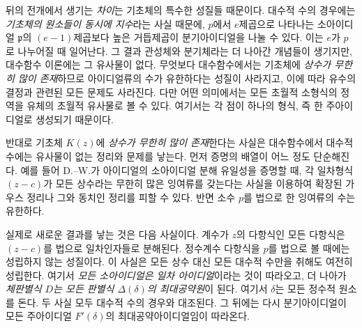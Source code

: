 뒤의 전개에서 생기는 \emph{차이}는 기초체의 특수한 성질들 때문이다. 대수적 수의 경우에는 \emph{기초체의 원소들이 동시에 지수}라는 사실 때문에, \(p\)에서 \(e\)제곱으로 나타나는 소아이디얼 \(\mathfrak p\)의 \((e-1)\)제곱보다 높은 거듭제곱이 분기아이디얼을 나눌 수 있다. 이는 \(e\)가 \(p\)로 나누어질 때 일어난다. 그 결과 관성체와 분기체라는 더 나아간 개념들이 생기지만, 대수함수 이론에는 그 유사물이 없다. 무엇보다 대수함수에서는 기초체에 \emph{상수가 무한히 많이 존재}하므로 아이디얼류의 수가 유한하다는 성질이 사라지고, 이에 따라 유수의 결정과 관련된 모든 문제도 사라진다. 다만 어떤 의미에서는 모든 초월적 소형식의 정역을 유체의 초월적 유사물로 볼 수 있다. 여기서는 각 점이 하나의 형식, 즉 한 주아이디얼로 생성되기 때문이다.

반대로 기초체 \(K(z)\)에 \emph{상수가 무한히 많이 존재}한다는 사실은 대수함수에서 대수적 수에는 유사물이 없는 정리와 문제를 낳는다. 먼저 증명의 배열이 어느 정도 단순해진다. 예를 들어 D.--W.가 아이디얼의 소아이디얼 분해 유일성을 증명할 때, 각 일차형식 \((z-c)\)가 모든 상수라는 무한히 많은 잉여류를 갖는다는 사실을 이용하여 \glqq{}확장된 가우스 정리\grqq{}나 그와 동치인 정리를 피할 수 있다. 반면 소수 \(p\)를 법으로 한 잉여류의 수는 유한하다.

실제로 새로운 결과를 낳는 것은 다음 사실이다. 계수가 \(z\)의 다항식인 모든 다항식은 \((z-c)\)를 법으로 일차인자들로 분해된다. 정수계수 다항식을 \(p\)를 법으로 볼 때에는 성립하지 않는 성질이다. 이 사실은 모든 상수 대신 모든 대수적 수만을 취해도 여전히 성립한다. 여기서 \emph{모든 소아이디얼은 일차 아이디얼}이라는 것이 따라오고, 더 나아가 \emph{체판별식 \(D\)는 모든 판별식 \(\Delta(\delta)\)의 최대공약원}이 된다. 여기서 \(\delta\)는 모든 정수적 원소를 돈다. 두 사실 모두 대수적 수의 경우와 대조된다. 그 뒤에는 다시 분기아이디얼이 모든 주아이디얼 \(F'(\delta)\)의 최대공약아이디얼임이 따라온다.

